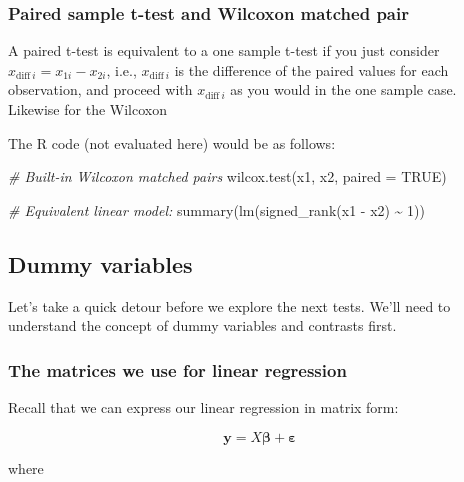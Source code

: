 \documentclass[
]{book}
\newenvironment{Shaded}{\begin{snugshade}}{\end{snugshade}}
\newcommand{\AttributeTok}[1]{\textcolor[rgb]{0.77,0.63,0.00}{#1}}
\newcommand{\CommentTok}[1]{\textcolor[rgb]{0.56,0.35,0.01}{\textit{#1}}}
\newcommand{\ConstantTok}[1]{\textcolor[rgb]{0.00,0.00,0.00}{#1}}
\newcommand{\DecValTok}[1]{\textcolor[rgb]{0.00,0.00,0.81}{#1}}
\newcommand{\FunctionTok}[1]{\textcolor[rgb]{0.00,0.00,0.00}{#1}}
\newcommand{\NormalTok}[1]{#1}
\newcommand{\SpecialCharTok}[1]{\textcolor[rgb]{0.00,0.00,0.00}{#1}}
\begin{document}
\hypertarget{paired-sample-t-test-and-wilcoxon-matched-pair}{%
\subsubsection{Paired sample t-test and Wilcoxon matched pair}\label{paired-sample-t-test-and-wilcoxon-matched-pair}}

A paired t-test is equivalent to a one sample t-test if you just consider \(x_{\text{diff}\ i} = x_{1i} - x_{2i}\), i.e., \(x_{\text{diff}\ i}\) is the difference of the paired values for each observation, and proceed with \(x_{\text{diff}\ i}\) as you would in the one sample case. Likewise for the Wilcoxon

The R code (not evaluated here) would be as follows:

\begin{Shaded}
\begin{Highlighting}[]
\CommentTok{\# Built{-}in Wilcoxon matched pairs}
\FunctionTok{wilcox.test}\NormalTok{(x1, x2, }\AttributeTok{paired =} \ConstantTok{TRUE}\NormalTok{)}

\CommentTok{\# Equivalent linear model:}
\FunctionTok{summary}\NormalTok{(}\FunctionTok{lm}\NormalTok{(}\FunctionTok{signed\_rank}\NormalTok{(x1 }\SpecialCharTok{{-}}\NormalTok{ x2) }\SpecialCharTok{\textasciitilde{}} \DecValTok{1}\NormalTok{))}
\end{Highlighting}
\end{Shaded}

\hypertarget{dummy-variables}{%
\subsection{Dummy variables}\label{dummy-variables}}

Let's take a quick detour before we explore the next tests. We'll need to understand the concept of dummy variables and contrasts first.

\hypertarget{the-matrices-we-use-for-linear-regression}{%
\subsubsection{The matrices we use for linear regression}\label{the-matrices-we-use-for-linear-regression}}

Recall that we can express our linear regression in matrix form:

\[\mathbf{y} = X\boldsymbol\beta + \boldsymbol\varepsilon\]

where
\end{document}
